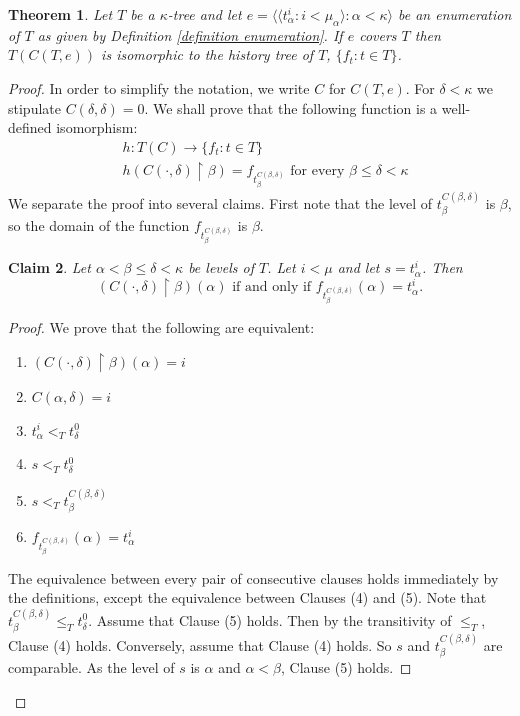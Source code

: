 \documentclass[11pt]{amsart}
\theoremstyle{plain}
\newtheorem{theorem}{Theorem}[section]
\newtheorem{claim}[theorem]{Claim}
\theoremstyle{definition} %
\theoremstyle{remark}
\newcommand{\be}{\begin{enumerate}}
\newcommand{\ee}{\end{enumerate}}
\begin{document}
\begin{theorem}\label{T isomorphic to T(C(T,e))}
Let $T$ be a $\kappa$-tree and let $e=\langle \langle t^i_\alpha:i<\mu_\alpha \rangle:\alpha<\kappa \rangle$ be an enumeration of $T$ as given by Definition \ref{definition enumeration}. If $e$ covers $T$ then $T(C(T,e))$ is isomorphic to the history tree of $T$, $\{f_t:t \in T\}$.%
\end{theorem}

\begin{proof}
In order to simplify the notation, we write $C$ for $C(T,e)$. For $\delta<\kappa$ we stipulate $C(\delta,\delta)=0$.
We shall prove that the following function is a well-defined isomorphism:
\begin{align*}
&h:T(C) \to \{f_t:t \in T\}\\
&h(C(\cdot,\delta) \restriction \beta)=f_{t_\beta^{C(\beta,\delta)}} \text{ for every } \beta \leq \delta<\kappa
\end{align*}
We separate the proof into several claims. First note that the level of $t_\beta^{C(\beta,\delta)}$ is $\beta$, so the domain of the function $f_{t_\beta^{C(\beta,\delta)}}$ is $\beta$.
\begin{claim}\label{claim for theorem 4.21}
Let $\alpha<\beta \leq \delta<\kappa$ be levels  of $T$. Let $i<\mu$ and let $s=t^i_\alpha$. Then
\[
(C(\cdot,\delta) \restriction \beta)(\alpha) \text{ if and only if } f_{t^{C(\beta,\delta)}_\beta}(\alpha)=t^i_\alpha.
\]
\end{claim}

\begin{proof}
We prove that the following are equivalent:
\be
\item $(C(\cdot,\delta) \restriction \beta)(\alpha)=i$
\item $C(\alpha,\delta)=i$
\item $t_\alpha^i <_T t^0_\delta$
\item $s <_T t_\delta^0$
\item $s <_T t_\beta^{C(\beta,\delta)}$
\item $f_{t^{C(\beta,\delta)}_\beta}(\alpha)=t^i_\alpha$
\ee
The equivalence between every pair of consecutive clauses holds immediately by the definitions, except the equivalence between Clauses (4) and (5). Note that $t_\beta^{C(\beta,\delta)} \leq_T t^0_\delta$. Assume that Clause (5) holds. Then by the transitivity of $\leq_T$, Clause (4) holds. Conversely, assume that Clause (4) holds. So $s$ and $t_\beta^{C(\beta,\delta)}$ are comparable. As the level of $s$ is $\alpha$ and $\alpha<\beta$, Clause (5) holds.
\end{proof}


\end{proof}
\end{document}

